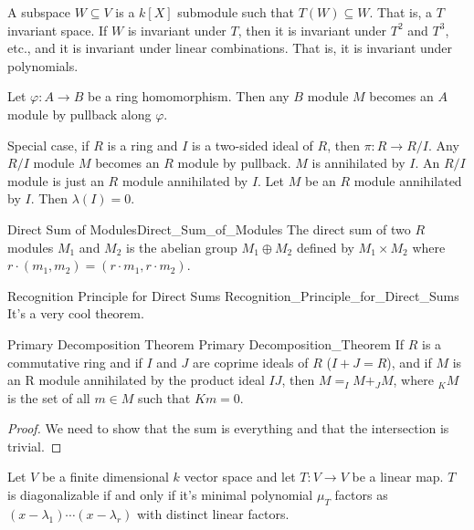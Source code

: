 \documentclass[crop=false,class=book,oneside]{standalone}                      %
\begin{document}
        A subspace $W\subseteq{V}$ is a $k[X]$ submodule such that
        $T(W)\subseteq{W}$. That is, a $T$ invariant space. If $W$ is invariant
        under $T$, then it is invariant under $T^{2}$ and $T^{3}$, etc., and
        it is invariant under linear combinations. That is, it is invariant
        under polynomials.
        \begin{example}
            Let $\varphi:A\rightarrow{B}$ be a ring homomorphism. Then any
            $B$ module $M$ becomes an $A$ module by pullback along $\varphi$.
        \end{example}
        Special case, if $R$ is a ring and $I$ is a two-sided ideal of $R$,
        then $\pi:R\rightarrow{R}/I$. Any $R/I$ module $M$ becomes an
        $R$ module by pullback. $M$ is annihilated by $I$. An $R/I$ module is
        just an $R$ module annihilated by $I$. Let $M$ be an $R$ module
        annihilated by $I$. Then $\lambda(I)=0$.
        \begin{ldefinition}{Direct Sum of Modules}{Direct_Sum_of_Modules}
            The direct sum of two $R$ modules $M_{1}$ and $M_{2}$ is the abelian
            group $M_{1}\oplus{M}_{2}$ defined by $M_{1}\times{M}_{2}$ where
            $r\cdot(m_{1},m_{2})=(r\cdot{m_{1}},r\cdot{m_{2}})$.
        \end{ldefinition}
        \begin{ltheorem}{Recognition Principle for Direct Sums}
                        {Recognition_Principle_for_Direct_Sums}
            It's a very cool theorem.
        \end{ltheorem}
        \begin{ltheorem}{Primary Decomposition Theorem}
                        {Primary Decomposition_Theorem}
            If $R$ is a commutative ring and if $I$ and $J$ are coprime ideals
            of $R$ ($I+J=R$), and if $M$ is an R module annihilated by the
            product ideal $IJ$, then $M=_{I}M+_{J}M$, where
            $_{K}M$ is the set of all $m\in{M}$ such that $Km=0$.
        \end{ltheorem}
        \begin{proof}
            We need to show that the sum is everything and that the intersection
            is trivial.
        \end{proof}
        Let $V$ be a finite dimensional $k$ vector space and let
        $T:V\rightarrow{V}$ be a linear map. $T$ is diagonalizable if and only
        if it's minimal polynomial $\mu_{T}$ factors as
        $(x-\lambda_{1})\cdots(x-\lambda_{r})$ with distinct linear factors.
\end{document}
